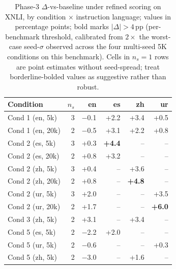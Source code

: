 \begin{table}[t]
  \centering
  \small
  \begin{tabular}{lrrrrr}
    \toprule
    Condition & $n_s$ & en & es & zh & ur \\
    \midrule
    Cond 1 (en, 5k) & 3 & $-$0.1 & +2.2 & +3.4 & +0.5 \\
    Cond 1 (en, 20k) & 2 & $-$0.5 & +3.1 & +2.2 & +0.8 \\
    Cond 2 (es, 5k) & 3 & +0.3 & \textbf{+4.4} & -- & -- \\
    Cond 2 (es, 20k) & 2 & +0.8 & +3.2 & -- & -- \\
    Cond 2 (zh, 5k) & 3 & +0.4 & -- & +3.6 & -- \\
    Cond 2 (zh, 20k) & 2 & +0.8 & -- & \textbf{+4.8} & -- \\
    Cond 2 (ur, 5k) & 3 & +2.0 & -- & -- & +3.5 \\
    Cond 2 (ur, 20k) & 2 & +1.7 & -- & -- & \textbf{+6.0} \\
    Cond 3 (zh, 5k) & 2 & +3.1 & -- & +3.4 & -- \\
    Cond 5 (es, 5k) & 2 & $-$2.2 & +2.0 & -- & -- \\
    Cond 5 (ur, 5k) & 2 & $-$0.6 & -- & -- & +0.3 \\
    Cond 5 (zh, 5k) & 2 & $-$3.0 & -- & +1.6 & -- \\
    \bottomrule
  \end{tabular}
  \caption{Phase-3 $\Delta$-vs-baseline under refined scoring on \textsc{XNLI}, by condition $\times$ instruction language; values in percentage points; bold marks $|\Delta| > 4$\,pp (per-benchmark threshold, calibrated from $2 \times$ the worst-case seed-$\sigma$ observed across the four multi-seed 5K conditions on this benchmark). Cells in $n_s\!=\!1$ rows are point estimates without seed-spread; treat borderline-bolded values as suggestive rather than robust.}
  \label{tab:t4-xnli-delta}
\end{table}

